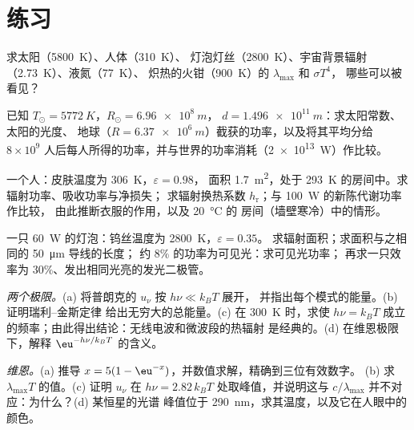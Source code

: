 \section{练习}

\begin{exercise}[$\star$]\label{exo:b2:thermal-radiation:1}
求太阳（\qty{5800}{K}）、人体（\qty{310}{K}）、
灯泡灯丝（\qty{2800}{K}）、宇宙背景辐射（\qty{2.73}{K}）、液氮（\qty{77}{K}）、
炽热的火钳（\qty{900}{K}）的 $\lambda_{\max}$ 和 $\sigma T^4$，
哪些可以被看见？
\end{exercise}

\begin{exercise}[$\star$]\label{exo:b2:thermal-radiation:2}
已知 $T_\odot = \qty{5772}{K}$，$R_\odot = \qty{6.96e8}{m}$，
$d = \qty{1.496e11}{m}$：求太阳常数、太阳的光度、
地球（$R = \qty{6.37e6}{m}$）截获的功率，以及将其平均分给 $8 \times 10^9$
人后每人所得的功率，并与世界的功率消耗（\qty{2e13}{W}）作比较。
\end{exercise}

\begin{exercise}[$\star$]\label{exo:b2:thermal-radiation:3}
一个人：皮肤温度为 \qty{306}{K}，$\varepsilon = 0.98$，
面积 \qty{1.7}{m^2}，处于 \qty{293}{K} 的房间中。求辐射功率、吸收功率与净损失；
求辐射换热系数 $h_{\text{r}}$；与 \qty{100}{W} 的新陈代谢功率作比较，
由此推断衣服的作用，以及 \qty{20}{\celsius} 的
房间（墙壁寒冷）中的情形。
\end{exercise}

\begin{exercise}[$\star$]\label{exo:b2:thermal-radiation:4}
一只 \qty{60}{W} 的灯泡：钨丝温度为 \qty{2800}{K}，$\varepsilon = 0.35$。
求辐射面积；求面积与之相同的 \qty{50}{\micro m} 导线的长度；
约 $8\%$ 的功率为可见光：求可见光功率；
再求一只效率为 $30\%$、发出相同光亮的发光二极管。
\end{exercise}

\begin{exercise}[$\star\star$]\label{exo:b2:thermal-radiation:5}
\emph{两个极限。}(a) 将普朗克的 $u_\nu$ 按 $h\nu \ll k_BT$ 展开，
并指出每个模式的能量。(b) 证明瑞利–金斯定律
给出无穷大的总能量。(c) 在 \qty{300}{K} 时，求使
$h\nu = k_BT$ 成立的频率；由此得出结论：无线电波和微波段的热辐射
是经典的。(d) 在维恩极限下，解释 $\eu^{-h\nu/k_BT}$ 的含义。
\end{exercise}

\begin{exercise}[$\star\star$]\label{exo:b2:thermal-radiation:6}
\emph{维恩。}(a) 推导 $x = 5(1 - \eu^{-x})$，并数值求解，精确到三位有效数字。
(b) 求 $\lambda_{\max}T$ 的值。(c) 证明 $u_\nu$
在 $h\nu = 2.82\,k_BT$ 处取峰值，并说明这与
$c/\lambda_{\max}$ 并不对应：为什么？(d) 某恒星的光谱
峰值位于 \qty{290}{nm}，求其温度，以及它在人眼中的颜色。
\end{exercise}

